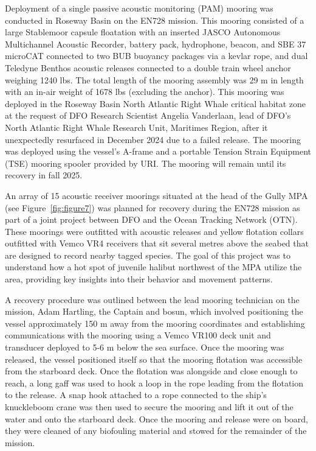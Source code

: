 \documentclass[12pt]{article}\usepackage[]{graphicx}\usepackage[]{color}
\begin{document}
Deployment of a single passive acoustic monitoring (PAM) mooring was conducted in Roseway Basin on the EN728 mission. This mooring consisted of a large Stablemoor capsule floatation with an inserted JASCO Autonomous Multichannel Acoustic Recorder, battery pack, hydrophone, beacon, and SBE 37 microCAT connected to two BUB buoyancy packages via a kevlar rope, and dual Teledyne Benthos acoustic releases connected to a double train wheel anchor weighing 1240 lbs. The total length of the mooring assembly was 29 m in length with an in-air weight of 1678 lbs (excluding the anchor). This mooring was deployed in the Roseway Basin North Atlantic Right Whale critical habitat zone at the request of DFO Research Scientist Angelia Vanderlaan, lead of DFO's North Atlantic Right Whale Research Unit, Maritimes Region, after it unexpectedly resurfaced in December 2024 due to a failed release. The mooring was deployed using the vessel's A-frame and a portable Tension Strain Equipment (TSE) mooring spooler provided by URI. The mooring will remain until its recovery in fall 2025.

An array of 15 acoustic receiver moorings situated at the head of the Gully MPA (see Figure~\ref{fig:figure7}) was planned for recovery during the EN728 mission as part of a joint project between DFO and the Ocean Tracking Network (OTN). These moorings were outfitted with acoustic releases and yellow flotation collars outfitted with Vemco VR4 receivers that sit several metres above the seabed that are designed to record nearby tagged species. The goal of this project was to understand how a hot spot of juvenile halibut northwest of the MPA utilize the area, providing key insights into their behavior and movement patterns.

A recovery procedure was outlined between the lead mooring technician on the mission, Adam Hartling, the Captain and bosun, which involved positioning the vessel approximately 150 m away from the mooring coordinates and establishing communications with the mooring using a Vemco VR100 deck unit and transducer deployed to 5-6 m below the sea surface. Once the mooring was released, the vessel positioned itself so that the mooring flotation was accessible from the starboard deck. Once the flotation was alongside and close enough to reach, a long gaff was used to hook a loop in the rope leading from the flotation to the release. A snap hook attached to a rope connected to the ship's knuckleboom crane was then used to secure the mooring and lift it out of the water and onto the starboard deck. Once the mooring and release were on board, they were cleaned of any biofouling material and stowed for the remainder of the mission.
\end{document}
